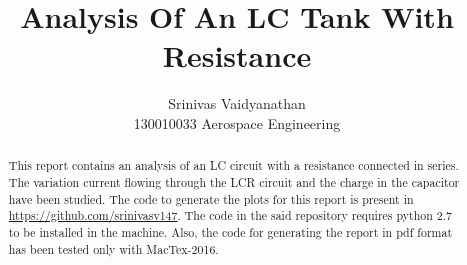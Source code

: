 \documentclass[12pt,a4paper]{report}
\begin{document}
\hypersetup{pageanchor=false}
\title{Analysis Of An LC Tank With Resistance}
\author{Srinivas Vaidyanathan \\ 130010033 Aerospace Engineering}
\maketitle
\hypersetup{pageanchor=true}
\begin{abstract}
  This report contains an analysis of an LC circuit with a resistance connected in series.
  The variation current flowing through the LCR circuit and the charge in the capacitor have been studied.
  The code to generate the plots for this report is present in \textcolor{blue}{\url{https://github.com/srinivasv147}}.
  The code in the said repository requires python 2.7 to be installed in the
  machine. Also, the code for generating the report in pdf format has been tested only with MacTex-2016.
\end{abstract}
\hypersetup{pageanchor=false}
\end{document}
